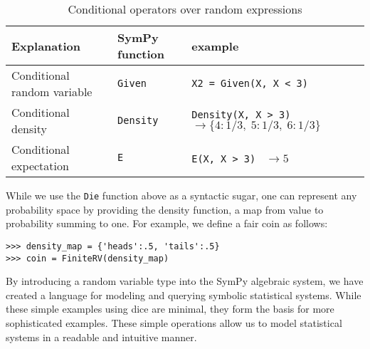 \begin{table}[h]
\begin{tabular}{|lll|}
\hline
Explanation & SymPy function & example\\ \hline
Conditional random variable & {\tt Given} & {\tt X2 = Given(X, X < 3)} \\ \hline
Conditional density & {\tt Density} & {\tt Density(X, X > 3) } $\rightarrow \{4: 1/3,\; 5: 1/3,\; 6: 1/3\}$ \\ \hline
Conditional expectation  & {\tt E} & {\tt E(X, X > 3) } $\rightarrow 5$ \\ \hline
\end{tabular}
\caption{Conditional operators over random expressions}
\label{tab:cond_ops}
\end{table}

While we use the {\tt Die} function above as a syntactic sugar, one can
represent any probability space by providing the density function, a map
from value to probability summing to one. For example, we define a fair coin as follows:
\begin{lstlisting}
>>> density_map = {'heads':.5, 'tails':.5}
>>> coin = FiniteRV(density_map)
\end{lstlisting}

By introducing a random variable type into the SymPy algebraic system, we have
created a language for modeling and querying symbolic statistical systems.
While these simple examples using dice are minimal, they form the basis for more
sophisticated examples.  These simple operations allow us to model statistical
systems in a readable and intuitive manner.
